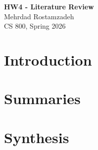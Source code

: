 \documentclass[12pt]{article}
\begin{document}
\begin{centering}
{\large\textbf{HW4 - Literature Review}}\\
\vspace{3mm} %
Mehrdad Rostamzadeh\\
CS 800, Spring 2026\\
\end{centering}



\section{Introduction}



\section{Summaries}





\section{Synthesis}




\end{document}

